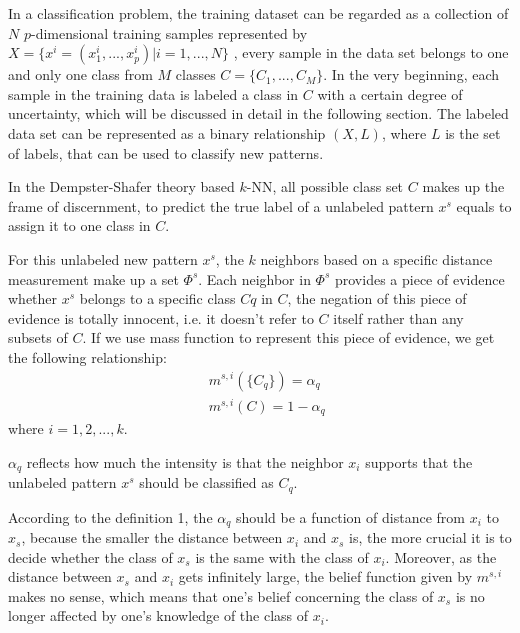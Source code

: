 \documentclass[runningheads]{llncs}
\begin{document}
In a classification problem, the training dataset can be regarded as a collection of $N$ $p$-dimensional training samples represented by $X=\{x^i=(x_1^i,...,x_p^i)|i=1,...,N\}$  , every sample in the data set belongs to one and only one class from $M$ classes $C=\{C_1,...,C_M\}$. In the very beginning, each sample in the training data is labeled a class in $C$ with a certain degree of uncertainty, which will be discussed in detail in the following section. The labeled data set can be represented as a binary relationship $(X, L)$, where $L$ is the set of labels, that can be used to classify new patterns.

In the Dempster-Shafer theory based $k$-NN, all possible class set $C$ makes up the frame of discernment, to predict the true label of a unlabeled pattern $x^s$ equals to assign it to one class in $C$.

For this unlabeled new pattern $x^s$, the $k$ neighbors based on a specific distance measurement make up a set $\Phi^s$. Each neighbor in $\Phi^s$ provides a piece of evidence whether $x^s$ belongs to a specific class $Cq$ in $C$, the negation of this piece of evidence is totally innocent, i.e. it doesn't refer to $C$ itself rather than any subsets of $C$. If we use mass function to represent this piece of evidence, we get the following relationship:
\begin{equation}
\begin{split}
&\ m^{s,i}( \{C_q\}) = \alpha_q
\\
&\ m^{s,i}(C) = 1-\alpha_q
\end{split}
\end{equation}
where $i=1,2,...,k$.
\begin{definition}
 $\alpha _q$ reflects how much the intensity is that the neighbor $x_i$ supports that the unlabeled pattern $x^s$ should be classified as $C_q$.
\end{definition}
According to the definition 1, the $\alpha _q$ should be a function of distance from $x_i$ to $x_s$, because the smaller the distance between  $x_i$ and $x_s$ is,  the more crucial it is to decide whether the class of $x_s$ is the same with the class of $x_i$. Moreover, as the distance between $x_s$ and $x_i$ gets infinitely large, the belief function given by $m^{s,i}$ makes no sense, which means that one’s belief concerning the class of $x_s$ is no longer affected by one’s knowledge of the class of $x_i$.
\end{document}
